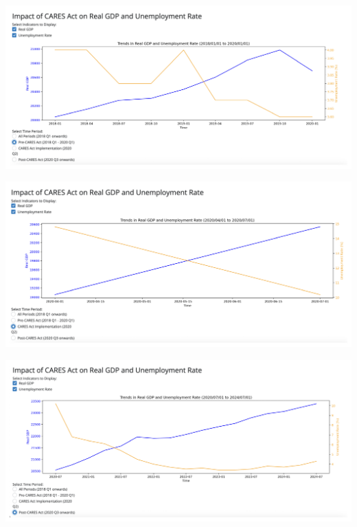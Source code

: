 \documentclass[
  letterpaper,
  DIV=11,
  numbers=noendperiod]{scrartcl}
\begin{document}
\includegraphics{finalproject_template_files/figure-pdf/cell-15-output-2.pdf}

\includegraphics{finalproject_template_files/figure-pdf/cell-15-output-3.pdf}

\includegraphics{finalproject_template_files/figure-pdf/cell-15-output-4.pdf}
\end{document}
